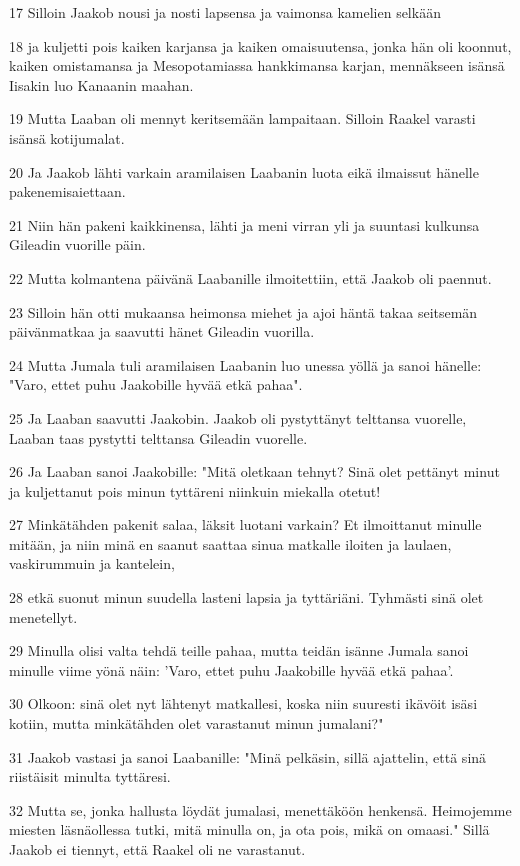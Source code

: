 \par 17 Silloin Jaakob nousi ja nosti lapsensa ja vaimonsa kamelien selkään
\par 18 ja kuljetti pois kaiken karjansa ja kaiken omaisuutensa, jonka hän oli koonnut, kaiken omistamansa ja Mesopotamiassa hankkimansa karjan, mennäkseen isänsä Iisakin luo Kanaanin maahan.
\par 19 Mutta Laaban oli mennyt keritsemään lampaitaan. Silloin Raakel varasti isänsä kotijumalat.
\par 20 Ja Jaakob lähti varkain aramilaisen Laabanin luota eikä ilmaissut hänelle pakenemisaiettaan.
\par 21 Niin hän pakeni kaikkinensa, lähti ja meni virran yli ja suuntasi kulkunsa Gileadin vuorille päin.
\par 22 Mutta kolmantena päivänä Laabanille ilmoitettiin, että Jaakob oli paennut.
\par 23 Silloin hän otti mukaansa heimonsa miehet ja ajoi häntä takaa seitsemän päivänmatkaa ja saavutti hänet Gileadin vuorilla.
\par 24 Mutta Jumala tuli aramilaisen Laabanin luo unessa yöllä ja sanoi hänelle: "Varo, ettet puhu Jaakobille hyvää etkä pahaa".
\par 25 Ja Laaban saavutti Jaakobin. Jaakob oli pystyttänyt telttansa vuorelle, Laaban taas pystytti telttansa Gileadin vuorelle.
\par 26 Ja Laaban sanoi Jaakobille: "Mitä oletkaan tehnyt? Sinä olet pettänyt minut ja kuljettanut pois minun tyttäreni niinkuin miekalla otetut!
\par 27 Minkätähden pakenit salaa, läksit luotani varkain? Et ilmoittanut minulle mitään, ja niin minä en saanut saattaa sinua matkalle iloiten ja laulaen, vaskirummuin ja kantelein,
\par 28 etkä suonut minun suudella lasteni lapsia ja tyttäriäni. Tyhmästi sinä olet menetellyt.
\par 29 Minulla olisi valta tehdä teille pahaa, mutta teidän isänne Jumala sanoi minulle viime yönä näin: 'Varo, ettet puhu Jaakobille hyvää etkä pahaa'.
\par 30 Olkoon: sinä olet nyt lähtenyt matkallesi, koska niin suuresti ikävöit isäsi kotiin, mutta minkätähden olet varastanut minun jumalani?"
\par 31 Jaakob vastasi ja sanoi Laabanille: "Minä pelkäsin, sillä ajattelin, että sinä riistäisit minulta tyttäresi.
\par 32 Mutta se, jonka hallusta löydät jumalasi, menettäköön henkensä. Heimojemme miesten läsnäollessa tutki, mitä minulla on, ja ota pois, mikä on omaasi." Sillä Jaakob ei tiennyt, että Raakel oli ne varastanut.
